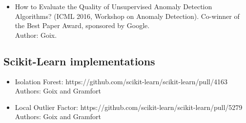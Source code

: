 \begin{listpublis}
{\begin{itemize}
\item How to Evaluate the Quality of Unsupervised Anomaly Detection Algorithms? (ICML 2016, Workshop on Anomaly Detection). Co-winner of the Best Paper Award, sponsored by Google.\\
Author: Goix. 
\end{itemize}

\subsection*{Scikit-Learn implementations}
\begin{itemize}
\item Isolation Forest: https://github.com/scikit-learn/scikit-learn/pull/4163\\
Authors: Goix and Gramfort
\item Local Outlier Factor: https://github.com/scikit-learn/scikit-learn/pull/5279\\
Authors: Goix and Gramfort
\end{itemize}
}
  
\end{listpublis}
